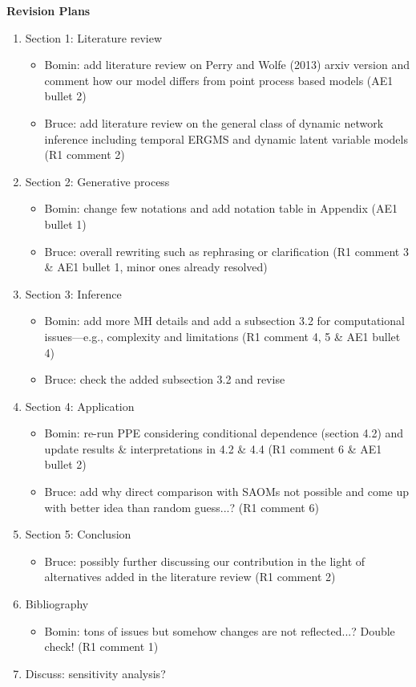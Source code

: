 \documentclass[12pt]{article}
\theoremstyle{definition}
\begin{document}
\newpage
\begin{center}
	
	\textbf{Revision Plans}
\end{center}
\begin{enumerate}
	\item Section 1: Literature review
	\begin{itemize}
		\item Bomin: add literature review on Perry and Wolfe (2013) arxiv version and comment how our model differs from point process based models (AE1 bullet 2)
		\item Bruce: add literature review on the general class of dynamic network inference including temporal ERGMS and dynamic latent variable models (R1 comment 2)
	\end{itemize}
	\item Section 2: Generative process
		\begin{itemize}
			\item Bomin: change few notations and add notation table in Appendix (AE1 bullet 1)
			\item Bruce: overall rewriting such as rephrasing or clarification (R1 comment 3 \& AE1 bullet 1, minor ones already resolved)
		\end{itemize}
			\item Section 3: Inference
			\begin{itemize}
		\item Bomin: add more MH details and add a subsection 3.2 for computational issues---e.g., complexity and limitations (R1 comment 4, 5 \& AE1 bullet 4)
				\item Bruce: check the added subsection 3.2 and revise
			\end{itemize}
			\item Section 4: Application
			\begin{itemize}
				\item Bomin: re-run PPE considering conditional dependence (section 4.2) and update results \& interpretations in 4.2 \& 4.4 (R1 comment 6 \& AE1 bullet 2)
				\item Bruce: add why direct comparison with SAOMs not possible and come up with better idea than random guess...? (R1 comment 6)
			\end{itemize}			
	
				\item Section 5: Conclusion
				\begin{itemize}
					\item Bruce: possibly further discussing our contribution in the light of alternatives added in the literature review (R1 comment 2)
				\end{itemize}			
					
					\item Bibliography
					\begin{itemize}
						\item Bomin: tons of issues but somehow changes are not reflected...? Double check! (R1 comment 1)
					\end{itemize}	
					
					\item Discuss: sensitivity analysis?					
\end{enumerate}
\end{document}
